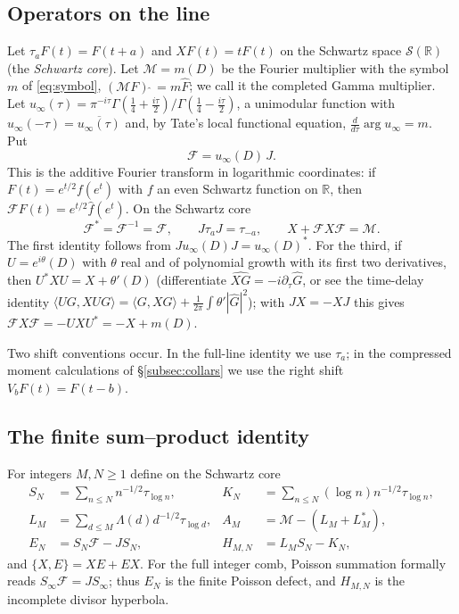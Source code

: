\documentclass[11pt]{amsart}
\theoremstyle{definition}
\theoremstyle{remark}
\newcommand{\R}{\mathbb R}
\newcommand{\Fh}{\widehat F}
\begin{document}
\subsection{Operators on the line}

Let $\tau_aF(t)=F(t+a)$ and $XF(t)=tF(t)$ on the Schwartz space $\mathcal S(\R)$ (the \emph{Schwartz
core}). Let $\mathcal M=m(D)$ be the Fourier multiplier with the symbol $m$ of \eqref{eq:symbol},
$(\mathcal MF)\,\widehat{}\,=m\Fh$; we call it the completed Gamma multiplier. Let
$u_\infty(\tau)=\pi^{-i\tau}\Gamma(\frac14+\frac{i\tau}2)/\Gamma(\frac14-\frac{i\tau}2)$, a
unimodular function with $u_\infty(-\tau)=\overline{u_\infty(\tau)}$ and, by Tate's local
functional equation, $\frac{d}{d\tau}\arg u_\infty=m$. Put
\[
 \mathscr F=u_\infty(D)\,J .
\]
This is the additive Fourier transform in logarithmic coordinates: if $F(t)=e^{t/2}f(e^t)$ with $f$
an even Schwartz function on $\R$, then $\mathscr FF(t)=e^{t/2}\widehat f(e^t)$. On the Schwartz
core
\[
 \mathscr F^*=\mathscr F^{-1}=\mathscr F,\qquad
 J\tau_aJ=\tau_{-a},\qquad X+\mathscr FX\mathscr F=\mathcal M .
\]
The first identity follows from $Ju_\infty(D)J=u_\infty(D)^*$. For the third, if $U=e^{i\theta}(D)$
with $\theta$ real and of polynomial growth with its first two derivatives, then
$U^*XU=X+\theta'(D)$ (differentiate $\widehat{XG}=-i\partial_\tau\widehat G$, or see the time-delay
identity $\langle UG,XUG\rangle=\langle G,XG\rangle+\frac1{2\pi}\int\theta'|\widehat G|^2$); with
$JX=-XJ$ this gives $\mathscr FX\mathscr F=-UXU^*=-X+m(D)$.

Two shift conventions occur. In the full-line identity we use $\tau_a$; in the compressed
moment calculations of \S\ref{subsec:collars} we use the right shift $V_bF(t)=F(t-b)$.

\subsection{The finite sum--product identity}

For integers $M,N\ge1$ define on the Schwartz core
\begin{align*}
 S_N&=\sum_{n\le N}n^{-1/2}\tau_{\log n},&
 K_N&=\sum_{n\le N}(\log n)n^{-1/2}\tau_{\log n},\\
 L_M&=\sum_{d\le M}\Lambda(d)d^{-1/2}\tau_{\log d},&
 A_M&=\mathcal M-(L_M+L_M^*),\\
 E_N&=S_N\mathscr F-JS_N,&
 H_{M,N}&=L_MS_N-K_N,
\end{align*}
and $\{X,E\}=XE+EX$. For the full integer comb, Poisson summation formally reads
$S_\infty\mathscr F=JS_\infty$; thus $E_N$ is the finite Poisson defect, and $H_{M,N}$ is the
incomplete divisor hyperbola.
\end{document}
